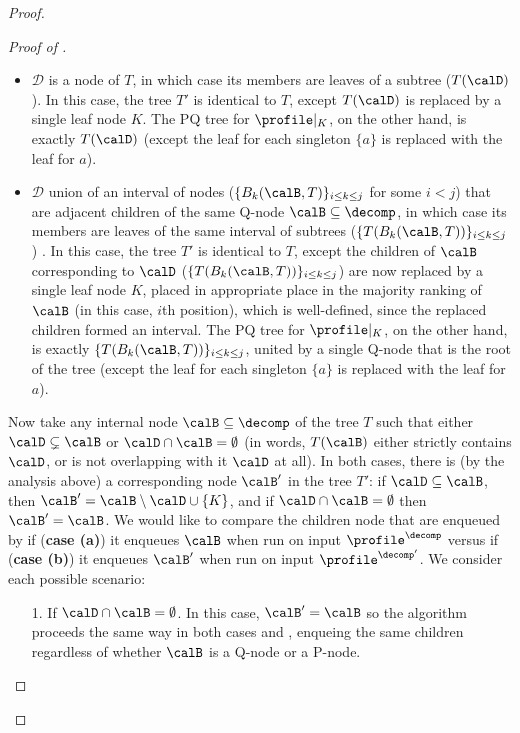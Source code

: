 \begin{proof}
\begin{proof}[Proof of ]
        \begin{itemize}
            \item $\mathcal{D}$ is a node of $T$, in which case its members are leaves of a subtree ($T(\calD)$). In this case, the tree $T'$ is identical to $T$, except $T(\calD)$ is replaced by a single leaf node $K$. The PQ tree for $\profile|_{K}$, on the other hand, is exactly $T(\calD)$ (except the leaf for each singleton $\{a\}$ is replaced with the leaf for $a$).
            \item $\mathcal{D}$ union of an interval of nodes ($\{B_k(\calB,T)\}_{i \leq k \leq j}$ for some $i < j$) that are adjacent children of the same Q-node $\calB \subseteq \decomp$, in which case its members are leaves of the same interval of subtrees ($\{T(B_k(\calB,T))\}_{i \leq k \leq j}$ ) . In this case, the tree $T'$ is identical to $T$, except the children of $\calB$ corresponding to $\calD$ ($\{T(B_k(\calB,T))\}_{i \leq k \leq j}$) are now replaced by a single leaf node $K$, placed in appropriate place in the majority ranking of $\calB$ (in this case, $i$th position), which is well-defined, since the replaced children formed an interval. The PQ tree for $\profile|_{K}$, on the other hand, is exactly $\{T(B_k(\calB,T))\}_{i \leq k \leq j}$, united by a single Q-node that is the root of the tree (except the leaf for each singleton $\{a\}$ is replaced with the leaf for $a$).
        \end{itemize}
        Now take any internal node $\calB \subseteq \decomp$ of the tree $T$ such that either $\calD \subsetneq \calB$ or  $\calD \cap \calB =\emptyset$ (in words, $T(\calB)$ either strictly contains $\calD$, or is not overlapping with it $\calD$ at all). In both  cases, there is (by the analysis above) a corresponding node $\calB'$ in the tree $T'$: if $\calD \subseteq \calB$, then $\calB'=\calB \setminus \calD \cup \{K\}$, and if $\calD \cap \calB =\emptyset$ then $\calB'=\calB$. We would like to compare the children node that are enqueued by  if (\textbf{case (a)}) it enqueues $\calB$ when run on input $\profile^\decomp$ versus if (\textbf{case (b)}) it enqueues $\calB'$ when run on input $\profile^{\decomp'}$. We consider each possible scenario:
        \begin{enumerate}
            \item[1.] If $\calD \cap \calB =\emptyset$. In this case, $\calB'=\calB$ so the algorithm proceeds the same way in both cases \casea and \caseb, enqueing the same children regardless of whether $\calB$ is a Q-node or a P-node.

\end{enumerate}
\end{proof}
\end{proof}
